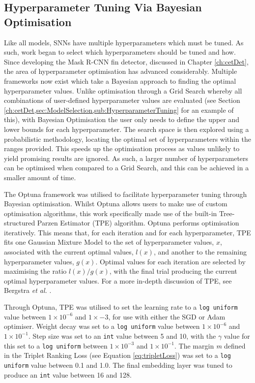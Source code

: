 \subsection{Hyperparameter Tuning Via Bayesian Optimisation }\label{ch:ID,sec:SNNDevelopment,sub:Optuna}

Like all models, SNNs have multiple hyperparameters which must be tuned. As such, work began to select which hyperparameters should be tuned and how. Since developing the Mask R-CNN fin detector, discussed in Chapter \ref{ch:cetDet}, the area of hyperparameter optimisation has advanced considerably. Multiple frameworks now exist which take a Bayesian approach to finding the optimal hyperparameter values. Unlike optimisation through a Grid Search whereby all combinations of user-defined hyperparameter values are evaluated (see Section \ref{ch:cetDet,sec:ModelSelection,sub:HyperparameterTuning} for an example of this), with Bayesian Optimisation the user only needs to define the upper and lower bounds for each hyperparameter. The search space is then explored using a probabilistic methodology, locating the optimal set of hyperparameters within the ranges provided. This speeds up the optimisation process as values unlikely to yield promising results are ignored. As such, a larger number of hyperparameters can be optimised when compared to a Grid Search, and this can be achieved in a smaller amount of time. 

The Optuna framework \cite{akiba_optuna_2019}  was utilised to facilitate hyperparameter tuning through Bayesian optimisation. Whilst Optuna allows users to make use of custom optimisation algorithms, this work specifically made use of the built-in Tree-structured Parzen Estimator (TPE)	 algorithm. Optuna performs optimisation iteratively. This means that, for each iteration and for each hyperparameter, TPE fits one Gaussian Mixture Model to the set of hyperparameter values, $x$, associated with the current optimal values, $l(x)$, and another to the remaining hyperparameter values, $g(x)$. Optimal values for each iteration are selected by maximising the ratio $l(x)/g(x)$, with the final trial producing the current optimal hyperparameter values. For a more in-depth discussion of TPE, see Bergstra \textit{et al.} \cite{bergstra_algorithms_2011}.

Through Optuna, TPE was utilised to set the learning rate to a \texttt{log uniform} value between $1\times10^{-6}$ and $1\times{-3}$, for use with either the SGD or Adam optimiser.  Weight decay was set to a \texttt{log uniform} value between $1\times10^{-6}$ and $1\times10^{-1}$. Step size was set to an \texttt{int} value between 5 and 10, with the $\gamma$ value for this set to a \texttt{log uniform} between $1\times10^{-3}$ and $1\times10^{-1}$. The margin \textit{m} defined in the Triplet Ranking Loss (see Equation \ref{eq:tripletLoss}) was set to a \texttt{log uniform} value between 0.1 and 1.0. The final embedding layer was tuned to produce an \texttt{int} value between 16 and 128.

